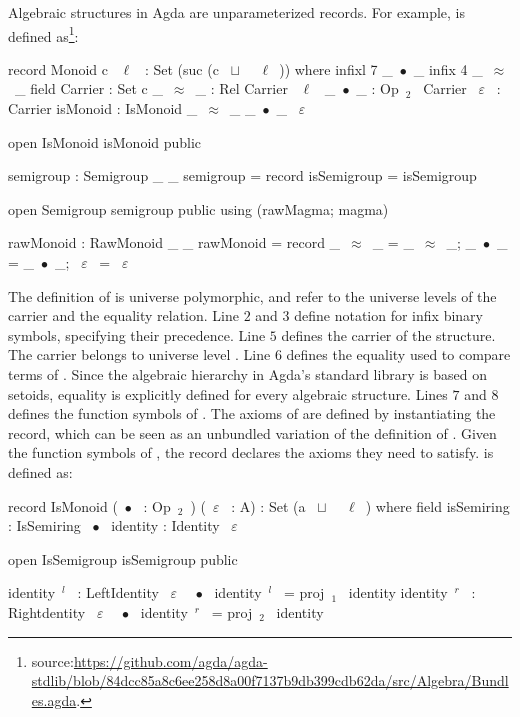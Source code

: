 Algebraic structures in Agda are unparameterized records. For example,  is defined as\footnote{source:\url{https://github.com/agda/agda-stdlib/blob/84dcc85a8c6ee258d8a00f7137b9db399cdb62da/src/Algebra/Bundles.agda}.}:
\begin{agdacodelnos}
record Monoid c ~$\ell$~ : Set (suc (c ~$\sqcup$~ ~$\ell$~)) where 
  infixl 7 _~$\bullet$~_
  infix 4 _~$\approx$~_
  field 
   Carrier : Set c 
   _~$\approx$~_ : Rel Carrier ~$\ell$~ 
   _~$\bullet$~_ : Op~$_2$~ Carrier 
   ~$\varepsilon$~ : Carrier 
   isMonoid : IsMonoid _~$\approx$~_ _~$\bullet$~_ ~$\varepsilon$~ 
   
   open IsMonoid isMonoid public
   
   semigroup : Semigroup _ _
   semigroup = record { isSemigroup = isSemigroup }
   
   open Semigroup semigroup public using (rawMagma; magma)
   
   rawMonoid : RawMonoid _ _
   rawMonoid = record { _~$\approx$~_ = _~$\approx$~_; _~$\bullet$~_ = _~$\bullet$~_; ~$\varepsilon$~ = ~$\varepsilon$~}
\end{agdacodelnos}
\noindent The definition of  is universe polymorphic,  and \lstmath{$\ell$} refer to the universe levels of the carrier and the equality relation. 
Line $2$ and $3$ define notation for infix binary symbols, specifying their precedence. Line $5$ defines the carrier of the  structure. The carrier belongs to universe level . 
Line $6$ defines the equality used to compare terms of . Since the algebraic hierarchy in Agda's standard library is based on setoids, equality is explicitly defined for every algebraic structure. 
Lines $7$ and $8$ defines the function symbols of . The axioms of  are defined by instantiating the  record, which can be seen as an unbundled variation of the definition of . Given the function symbols of , the  record declares the axioms they need to satisfy.  is defined as: 
\begin{agdacode}
record IsMonoid (~$\bullet$~ : Op~$_2$~) (~$\varepsilon$~ : A) : Set (a ~$\sqcup$~ ~$\ell$~) where 
  field 
   isSemiring : IsSemiring ~$\bullet$~ 
   identity : Identity ~$\varepsilon$~
     
  open IsSemigroup isSemigroup public
     
  identity~$^l$~ : LeftIdentity ~$\varepsilon$~ ~$\bullet$~ 
  identity~$^l$~ = proj~$_1$~ identity  
  identity~$^r$~ : Rightdentity ~$\varepsilon$~ ~$\bullet$~ 
  identity~$^r$~ = proj~$_2$~ identity           
\end{agdacode}

